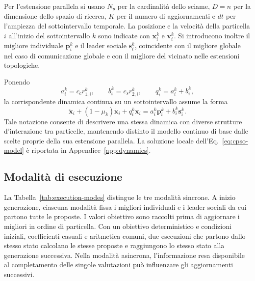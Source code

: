 Per l'estensione parallela si usano $N_p$ per la cardinalit\`a dello sciame, $D=n$ per la dimensione dello spazio di ricerca, $K$ per il numero di aggiornamenti e $dt$ per l'ampiezza del sottointervallo temporale. La posizione e la velocit\`a della particella $i$ all'inizio del sottointervallo $k$ sono indicate con $\bm x_i^k$ e $\bm v_i^k$. Si introducono inoltre il migliore individuale $\bm p_i^k$ e il leader sociale $\bm s_i^k$, coincidente con il migliore globale nel caso di comunicazione globale e con il migliore del vicinato nelle estensioni topologiche.

Ponendo
\begin{equation}
 a_i^k=c_c r_{1,i}^k,\qquad
 b_i^k=c_s r_{2,i}^k,\qquad
 q_i^k=a_i^k+b_i^k,
 \label{eq:cpso-weights}
\end{equation}
la corrispondente dinamica continua su un sottointervallo assume la forma
\begin{equation}
 \ddot{\bm x}_i+(1-\mu_k)\dot{\bm x}_i
 +q_i^k\bm x_i=a_i^k\bm p_i^k+b_i^k\bm s_i^k.
 \label{eq:cpso-model}
\end{equation}
Tale notazione consente di descrivere una stessa dinamica con diverse strutture d'interazione tra particelle, mantenendo distinto il modello continuo di base dalle scelte proprie della sua estensione parallela. La soluzione locale dell'Eq.~\eqref{eq:cpso-model} è riportata in Appendice~\ref{app:dynamics}.

\subsection{Modalità di esecuzione}
La Tabella~\ref{tab:execution-modes} distingue le tre modalità sincrone. A inizio generazione, ciascuna modalità fissa i migliori individuali e i leader sociali da cui partono tutte le proposte. I valori obiettivo sono raccolti prima di aggiornare i migliori in ordine di particella. Con un obiettivo deterministico e condizioni iniziali, coefficienti casuali e aritmetica comuni, due esecuzioni che partono dallo stesso stato calcolano le stesse proposte e raggiungono lo stesso stato alla generazione successiva. Nella modalità asincrona, l'informazione resa disponibile al completamento delle singole valutazioni può influenzare gli aggiornamenti successivi.


